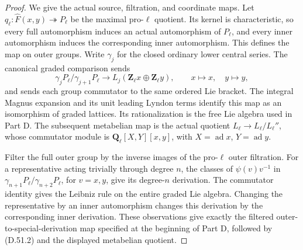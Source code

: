 \begin{proof}
We give the actual source, filtration, and coordinate maps.
Let \(q_\ell:\widehat F(x,y)\twoheadrightarrow P_\ell\)
be the maximal pro-\(\ell\) quotient. Its kernel is characteristic,
so every full automorphism induces an actual automorphism of
\(P_\ell\), and every inner automorphism induces the corresponding
inner automorphism. This defines the map on outer groups.
Write \(\gamma_j\) for the closed ordinary lower central series.
The canonical graded comparison sends
\[
 \gamma_jP_\ell/\gamma_{j+1}P_\ell
          \longrightarrow L_j(\mathbf Z_\ell x\oplus\mathbf Z_\ell y),
 \qquad x\longmapsto x,\quad y\longmapsto y,
 \tag{D.51.2}
\]
and sends each group commutator to the same ordered Lie bracket.
The integral Magnus expansion and its unit leading Lyndon terms
identify this map as an isomorphism of graded lattices.
Its rationalization is the free Lie algebra used in Part D.
The subsequent metabelian map is the actual quotient
\(L_\ell\to L_\ell/L_\ell''\), whose commutator module is
\(\mathbf Q_\ell[X,Y][x,y]\), with
\(X=\operatorname{ad}x\), \(Y=\operatorname{ad}y\).

Filter the full outer group by the inverse images of the
pro-\(\ell\) outer filtration. For a representative acting
trivially through degree \(n\), the classes of
\(\psi(v)v^{-1}\) in
\(\gamma_{n+1}P_\ell/\gamma_{n+2}P_\ell\), for
\(v=x,y\), give its degree-\(n\) derivation.
The commutator identity gives the Leibniz rule on the entire
graded Lie algebra. Changing the representative by an inner
automorphism changes this derivation by the corresponding
inner derivation. These observations give exactly the
filtered outer-to-special-derivation map specified at the
beginning of Part D, followed by \textup{(D.51.2)} and the
displayed metabelian quotient.


\end{proof}
